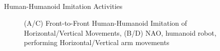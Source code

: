 \subsection{}
{

\begin{frame}{Human-Humanoid Imitation Activities}
    \begin{figure}
	\caption[PA]{(A/C) Front-to-Front Human-Humanoid Imitation 
		of Horizontal/Vertical Movements,
		(B/D) NAO, humanoid robot, performing Horizontal/Vertical arm movements
		}
   \end{figure}
	
\end{frame}
}



